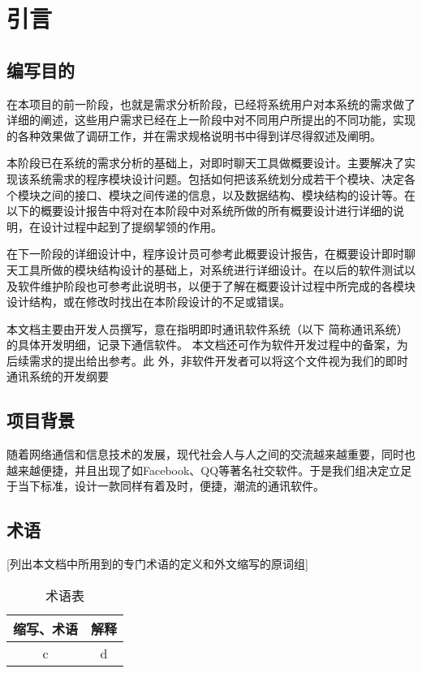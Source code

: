 \chapter{引言}
\section{编写目的}
在本项目的前一阶段，也就是需求分析阶段，已经将系统用户对本系统的需求做了详细的阐述，这些用户需求已经在上一阶段中对不同用户所提出的不同功能，实现的各种效果做了调研工作，并在需求规格说明书中得到详尽得叙述及阐明。

本阶段已在系统的需求分析的基础上，对即时聊天工具做概要设计。主要解决了实现该系统需求的程序模块设计问题。包括如何把该系统划分成若干个模块、决定各个模块之间的接口、模块之间传递的信息，以及数据结构、模块结构的设计等。在以下的概要设计报告中将对在本阶段中对系统所做的所有概要设计进行详细的说明，在设计过程中起到了提纲挈领的作用。

在下一阶段的详细设计中，程序设计员可参考此概要设计报告，在概要设计即时聊天工具所做的模块结构设计的基础上，对系统进行详细设计。在以后的软件测试以及软件维护阶段也可参考此说明书，以便于了解在概要设计过程中所完成的各模块设计结构，或在修改时找出在本阶段设计的不足或错误。

本文档主要由开发人员撰写，意在指明即时通讯软件系统（以下
简称通讯系统）的具体开发明细，记录下通信软件。
本文档还可作为软件开发过程中的备案，为后续需求的提出给出参考。此
外，非软件开发者可以将这个文件视为我们的即时通讯系统的开发纲要

\section{项目背景}
随着网络通信和信息技术的发展，现代社会人与人之间的交流越来越重要，同时也越来越便捷，并且出现了如Facebook、QQ等著名社交软件。于是我们组决定立足于当下标准，设计一款同样有着及时，便捷，潮流的通讯软件。

\section{术语}
[列出本文档中所用到的专门术语的定义和外文缩写的原词组]
\begin{table}[htbp]
\centering
\caption{术语表} \label{tab:terminology}
\begin{tabular}{|c|c|}
    \hline
    缩写、术语 & 解释 \\
    \hline
    c & d \\
    \hline
\end{tabular}
\end{table}